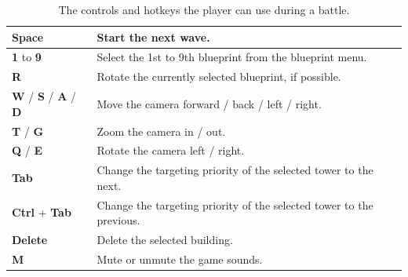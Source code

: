 \begin{table}[H]
\begin{tabular}{m{}m{}}
        \textbf{Space}                                    & Start the next wave.                                                 \\\midrule
        \textbf{1} to \textbf{9}                          & Select the 1st to 9th blueprint from the blueprint menu.             \\\midrule
        \textbf{R}                                        & Rotate the currently selected blueprint, if possible.                \\\midrule
        \textbf{W} / \textbf{S} / \textbf{A} / \textbf{D} & Move the camera forward / back / left / right.                       \\\midrule
        \textbf{T} / \textbf{G}                           & Zoom the camera in / out.                                            \\\midrule
        \textbf{Q} / \textbf{E}                           & Rotate the camera left / right.                                      \\\midrule
        \textbf{Tab}                                      & Change the targeting priority of the selected tower to the next.     \\\midrule
        \textbf{Ctrl} + \textbf{Tab}                      & Change the targeting priority of the selected tower to the previous. \\\midrule
        \textbf{Delete}                                   & Delete the selected building.                                        \\\midrule
        \textbf{M}                                        & Mute or unmute the game sounds.                                      \\
        \bottomrule
    \end{tabular}
    \caption{The controls and hotkeys the player can use during a battle.}
    \label{tab:controls}
\end{table}


